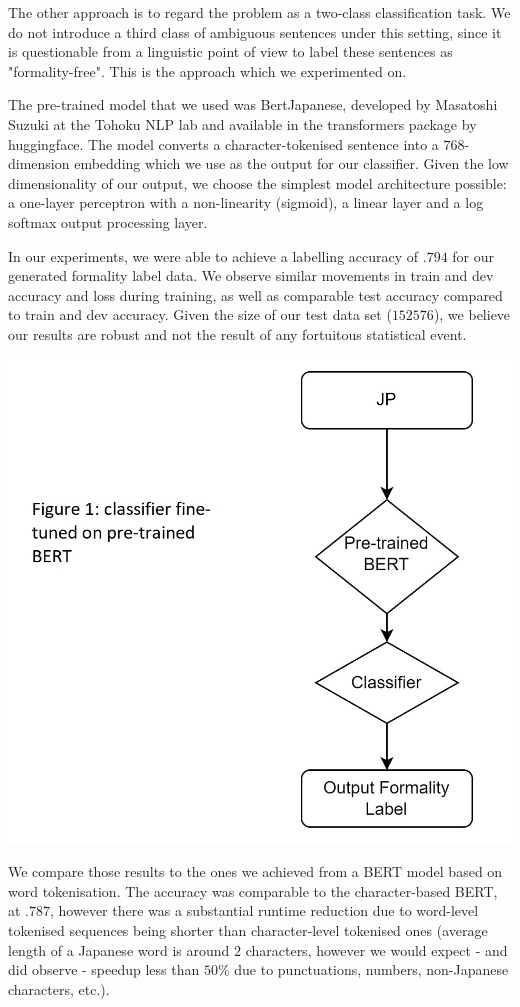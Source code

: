 \documentclass[11pt]{article}
\begin{document}
The other approach is to regard the problem as a two-class classification task. We do not introduce a third class of ambiguous sentences under this setting, since it is questionable from a linguistic point of view to label these sentences as "formality-free". This is the approach which we experimented on.

The pre-trained model that we used was BertJapanese, developed by Masatoshi Suzuki at the Tohoku NLP lab and available in the transformers package by huggingface. The model converts a character-tokenised sentence into a $768$-dimension embedding which we use as the output for our classifier. Given the low dimensionality of our output, we choose the simplest model architecture possible: a one-layer perceptron with a non-linearity (sigmoid), a linear layer and a log softmax output processing layer.

In our experiments, we were able to achieve a labelling accuracy of $.794$ for our generated formality label data. We observe similar movements in train and dev accuracy and loss during training, as well as comparable test accuracy compared to train and dev accuracy. Given the size of our test data set ($152576$), we believe our results are robust and not the result of any fortuitous statistical event.

\includegraphics{images/pre-trained.jpg}

We compare those results to the ones we achieved from a BERT model based on word tokenisation. The accuracy was comparable to the character-based BERT, at $.787$, however there was a substantial runtime reduction due to word-level tokenised sequences being shorter than character-level tokenised ones (average length of a Japanese word is around $2$ characters, however we would expect - and did observe - speedup less than $50\%$ due to punctuations, numbers, non-Japanese characters, etc.). 
\end{document}
